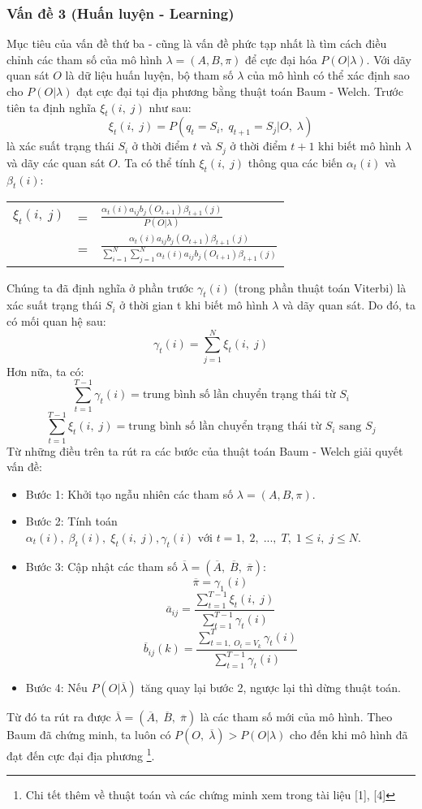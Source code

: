 \subsubsection{Vấn đề 3 (Huấn luyện - Learning)}
Mục tiêu của vấn đề thứ ba - cũng là vấn đề phức tạp nhất là tìm cách điều chỉnh các tham số của mô hình $\lambda=(A,B,\pi)$ để cực đại hóa $P(O|\lambda)$. Với dãy quan sát $O$ là dữ liệu huấn luyện, bộ tham số $\lambda$ của mô hình có thể xác định sao cho $P(O|\lambda)$ đạt cực đại tại địa phương bằng thuật toán Baum - Welch. Trước tiên ta định nghĩa $\xi_t(i,\; j)$ như sau:
$$\xi_t(i,\; j)=P(q_t=S_i,\; q_{t+1}=S_j|O,\; \lambda)$$
là xác suất trạng thái $S_i$ ở thời điểm $t$ và $S_j$ ở thời điểm $t+1$ khi biết mô hình $\lambda$ và dãy các quan sát $O$. Ta có thể tính $\xi_t(i,\; j)$ thông qua các biến $\alpha_t(i)$ và $\beta_t(i)$:
\begin{center}
	\begin{tabular}{lll}
		$\xi_t(i,\; j)$ & = & $\frac{\alpha_t(i)a_{ij}b_j(O_{t+1})\beta_{t+1}(j)}{P(O|\lambda)}$ \\ 
		& = & $\frac{\alpha_t(i)a_{ij}b_j(O_{t+1})\beta_{t+1}(j)}{\sum_{i=1}^{N}\sum_{j=1}^{N}\alpha_t(i)a_{ij}b_j(O_{t+1})\beta_{t+1}(j)}$ \\ 
	\end{tabular}
\end{center}
Chúng ta đã định nghĩa ở phần trước $\gamma_t(i)$ (trong phần thuật toán Viterbi) là xác suất trạng thái $S_i$ ở thời gian t khi biết mô hình $\lambda$ và dãy quan sát. Do đó, ta có mối quan hệ sau:
$$\gamma_t(i)=\sum_{j=1}^{N}\xi_t(i,\;j)$$
Hơn nữa, ta có:
$$\sum_{t=1}^{T-1}\gamma_t(i)=\text{trung bình số lần chuyển trạng thái từ } S_i$$
$$\sum_{t=1}^{T-1}\xi_t(i,\;j)=\text{trung bình số lần chuyển trạng thái từ } S_i \text{ sang } S_j$$
\newpage
Từ những điều trên ta rút ra các bước của thuật toán Baum - Welch giải quyết vấn đề:
\begin{itemize}
	\item Bước 1: Khởi tạo ngẫu nhiên các tham số $\lambda = (A,B,\pi)$.
	\item Bước 2: Tính toán $\alpha_t(i),\; \beta_t(i),\; \xi_t(i,\;j),\gamma_t(i) \text{ với } t = 1,\; 2,\; ...,\; T, \; 1 \leq i,\; j \leq N$.
	\item Bước 3: Cập nhật các tham số $\overline{\lambda} = (\overline{A},\; \overline{B},\; \overline{\pi})$:
	$$\overline{\pi} = \gamma_1(i)$$
	$$\overline{a}_{ij} = \frac{\sum_{t=1}^{T-1}\xi_t(i,\;j)}{\sum_{t=1}^{T-1}\gamma_t(i)}$$
	$$\overline{b}_{ij}(k) = \frac{\sum_{t=1,\; O_t=V_k}^{T}\gamma_t(i)}{\sum_{t=1}^{T-1}\gamma_t(i)}$$
	\item Bước 4: Nếu $P(O|\overline{\lambda})$ tăng quay lại bước 2, ngược lại thì dừng thuật toán.
\end{itemize}
Từ đó ta rút ra được $\overline{\lambda} = (\overline{A},\; \overline{B},\; \overline{\pi})$ là các tham số mới của mô hình. Theo Baum đã chứng minh, ta luôn có $P(O,\; \overline{\lambda}) > P(O|\lambda)$ cho đến khi mô hình đã đạt đến cực đại địa phương \footnote{Chi tết thêm về thuật toán và các chứng minh xem trong tài liệu [1], [4]}.

